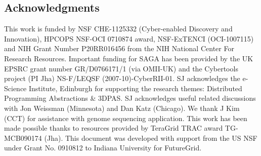 \documentclass{sig-alternate}
\newcommand{\upp}{\vspace*{-0.5em}}
\begin{document}
\upp
\subsection*{Acknowledgments}
\scriptsize This work is funded by NSF CHE-1125332 (Cyber-enabled
Discovery and Innovation), HPCOPS NSF-OCI 0710874 award, NSF-ExTENCI
(OCI-1007115) and NIH Grant Number P20RR016456 from the NIH National
Center For Research Resources. Important funding for SAGA has been
provided by the UK EPSRC grant number GR/D0766171/1 (via OMII-UK) and
the Cybertools project (PI Jha) NS-F/LEQSF (2007-10)-CyberRII-01. SJ
acknowledges the e-Science Institute, Edinburgh for supporting the
research themes: Distributed Programming Abstractions \& 3DPAS. SJ 
acknowledges useful related discussions with Jon Weissman (Minnesota)
and Dan Katz (Chicago). We thank J Kim (CCT) for assistance with
genome sequencing application. This work has been made possible
thanks to resources provided by TeraGrid TRAC award
TG-MCB090174 (Jha). This document was developed with support from the
US NSF under Grant No. 0910812 to Indiana University for FutureGrid.
\end{document}
